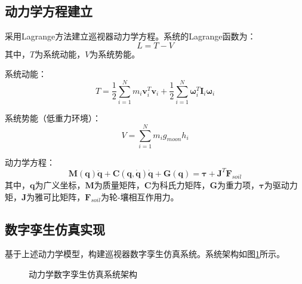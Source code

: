 \subsection{动力学方程建立}
\label{subsec:dynamics}

采用Lagrange方法建立巡视器动力学方程。系统的Lagrange函数为：
\begin{equation}
    L = T - V
    \label{eq:lagrange}
\end{equation}
其中，$T$为系统动能，$V$为系统势能。

系统动能：
\begin{equation}
    T = \frac{1}{2}\sum_{i=1}^{N} m_i \mathbf{v}_i^T \mathbf{v}_i + \frac{1}{2}\sum_{i=1}^{N} \boldsymbol{\omega}_i^T \mathbf{I}_i \boldsymbol{\omega}_i
    \label{eq:kinetic}
\end{equation}

系统势能（低重力环境）：
\begin{equation}
    V = \sum_{i=1}^{N} m_i g_{moon} h_i
    \label{eq:potential}
\end{equation}

动力学方程：
\begin{equation}
    \mathbf{M}(\mathbf{q})\ddot{\mathbf{q}} + \mathbf{C}(\mathbf{q}, \dot{\mathbf{q}})\dot{\mathbf{q}} + \mathbf{G}(\mathbf{q}) = \boldsymbol{\tau} + \mathbf{J}^T \mathbf{F}_{soil}
    \label{eq:dynamics_eq}
\end{equation}
其中，$\mathbf{q}$为广义坐标，$\mathbf{M}$为质量矩阵，$\mathbf{C}$为科氏力矩阵，$\mathbf{G}$为重力项，$\boldsymbol{\tau}$为驱动力矩，$\mathbf{J}$为雅可比矩阵，$\mathbf{F}_{soil}$为轮-壤相互作用力。

\subsection{数字孪生仿真实现}
\label{subsec:dt_simulation}

基于上述动力学模型，构建巡视器数字孪生仿真系统。系统架构如图\ref{fig:dyn_sim}所示。

\begin{figure}[htbp]
    \centering
    \caption{动力学数字孪生仿真系统架构}
    \label{fig:dyn_sim}
\end{figure}

